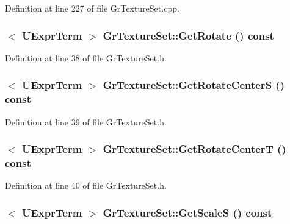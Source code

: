 Definition at line 227 of file GrTextureSet.cpp.\hypertarget{class_gr_texture_set_b7f31669a0e6b71ac1ddd1dbf252d331}{
\subsubsection[{GetRotate}]{$<$ {\bf UExprTerm} $>$ GrTextureSet::GetRotate () const}}
\label{class_gr_texture_set_b7f31669a0e6b71ac1ddd1dbf252d331}




Definition at line 38 of file GrTextureSet.h.\hypertarget{class_gr_texture_set_3c2f965fdfa704b679922db0825ce6e1}{
\subsubsection[{GetRotateCenterS}]{$<$ {\bf UExprTerm} $>$ GrTextureSet::GetRotateCenterS () const}}
\label{class_gr_texture_set_3c2f965fdfa704b679922db0825ce6e1}




Definition at line 39 of file GrTextureSet.h.\hypertarget{class_gr_texture_set_69920f47faf856fd77c7637b0167b562}{
\subsubsection[{GetRotateCenterT}]{$<$ {\bf UExprTerm} $>$ GrTextureSet::GetRotateCenterT () const}}
\label{class_gr_texture_set_69920f47faf856fd77c7637b0167b562}




Definition at line 40 of file GrTextureSet.h.\hypertarget{class_gr_texture_set_10cace9330185ac22ac11a7461843812}{
\subsubsection[{GetScaleS}]{$<$ {\bf UExprTerm} $>$ GrTextureSet::GetScaleS () const}}
\label{class_gr_texture_set_10cace9330185ac22ac11a7461843812}




